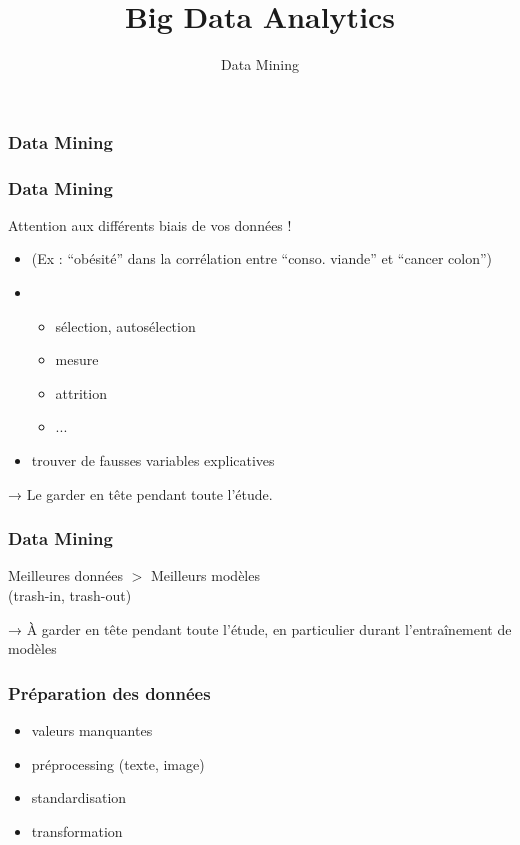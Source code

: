 \documentclass{formation}
\title{Big Data Analytics}
\subtitle{Data Mining}
\begin{document}
\maketitle

\begin{frame}
  \frametitle{Data Mining}
\end{frame}


\begin{frame}
  \frametitle{Data Mining}
  Attention aux différents biais de vos données !
  \begin{itemize}[<+->]
  \item {} (Ex : ``obésité'' dans la corrélation entre ``conso. viande'' et ``cancer colon'')
  \item {}
    \begin{itemize}[<+->]
    \item sélection, autosélection
    \item mesure
    \item attrition
    \item ...
    \end{itemize}
  \item trouver de fausses variables explicatives
  \end{itemize}
  \pause
  → Le garder en tête pendant toute l'étude.
\end{frame}

\begin{frame}
  \frametitle{Data Mining}
  \begin{center}
    Meilleures données $>$ Meilleurs modèles \\
    (trash-in, trash-out) \\
  \end{center}
  → À garder en tête pendant toute l'étude, en particulier durant
  l'entraînement de modèles
\end{frame}

\begin{frame}
  \frametitle{Préparation des données}
  \begin{itemize}
  \item valeurs manquantes
  \item préprocessing (texte, image)
  \item standardisation
  \item transformation
  \end{itemize}
\end{frame}
\end{document}
